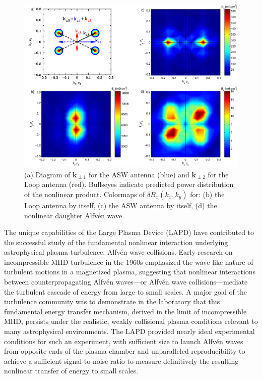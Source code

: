 \documentclass[11pt]{article}
\newcommand\Alfven{Alfv\'en }
\newcommand{\V}[1]{\mathbf{#1}}
\renewcommand{\cite}{\citep}
\begin{document}
\begin{figure}
\begin{center}
\includegraphics[width=3.5truein]{iowa}
\caption{\small  (a) Diagram of $\V{k}_{\perp 1}$ for the ASW
antenna (blue) and  $\V{k}_{\perp 2}$ for the Loop antenna (red). Bullseyes indicate predicted
power distribution of the nonlinear product.  Colormaps
of $\delta B_x(k_x,k_y)$ for: (b) the Loop antenna by itself, (c) the
ASW antenna by itself, (d) the nonlinear daughter \Alfven wave.}\label{iowa}
\end{center}
\end{figure}


The unique capabilities of the Large Plasma Device (LAPD) have
contributed to the successful study of the fundamental nonlinear
interaction underlying astrophysical plasma turbulence, \Alfven wave
collisions.  Early research on incompressible MHD turbulence in the
1960s \cite{Iroshnikov:1963,Kraichnan:1965} emphasized the wave-like
nature of turbulent motions in a magnetized plasma, suggesting that
nonlinear interactions between counterpropagating \Alfven waves---or
\Alfven wave collisions---mediate the turbulent cascade of energy from
large to small scales. A major goal of the turbulence community was to
demonstrate in the laboratory that this fundamental energy transfer
mechanism, derived in the limit of incompressible MHD, persists under
the realistic, weakly collisional plasma conditions relevant to many
astrophysical environments. The LAPD provided nearly ideal
experimental conditions for such an experiment, with sufficient size
to launch \Alfven waves from opposite ends of the plasma chamber and
unparalleled reproducibility to achieve a sufficient signal-to-noise
ratio to measure definitively the resulting nonlinear transfer of
energy to small scales.
\end{document}

